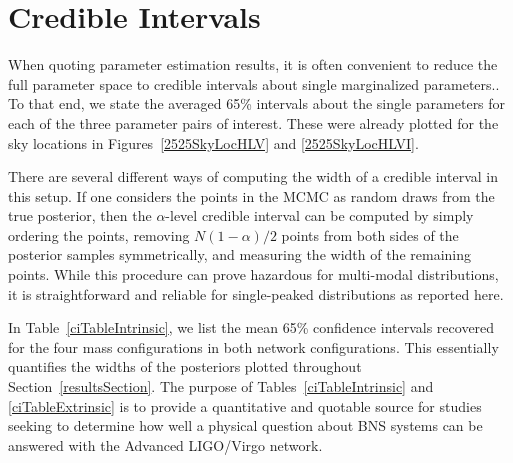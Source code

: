 \documentclass[11pt,a4paper]{emulateapj} 
\newcommand{\carl}[1]{{\color{red} #1}}
\begin{document}

\section{Credible Intervals}
\label{ciSection}

When quoting parameter estimation results, it is often convenient to
reduce the full parameter space to credible intervals about single
marginalized parameters..  To that end, we state the averaged 65\%
intervals about the single parameters for each of the three
parameter pairs of interest.  These were already plotted for the sky
locations in Figures~\ref{2525SkyLocHLV} and \ref{2525SkyLocHLVI}.

There are several different ways of computing the width of a credible
interval in this setup.  If one considers the points in the MCMC as
random draws from the true posterior, then the $\alpha$-level credible
interval can be computed by simply ordering the points, removing
$N(1-\alpha )/2$ points from both sides of the posterior samples
symmetrically, and measuring the width of the remaining points.  While
this procedure can prove hazardous for multi-modal distributions, it
is straightforward and reliable for single-peaked distributions as
reported here.

In Table~\ref{ciTableIntrinsic}, we list the mean 65\% confidence
intervals recovered for the four mass configurations in both network
configurations. This essentially quantifies the widths of the
posteriors plotted throughout Section~\ref{resultsSection}.  The
purpose of Tables~\ref{ciTableIntrinsic} and \ref{ciTableExtrinsic} is
to provide a quantitative and quotable source for studies seeking to
determine how well a physical question about BNS systems can be
answered with the Advanced LIGO/Virgo network.
\end{document}
